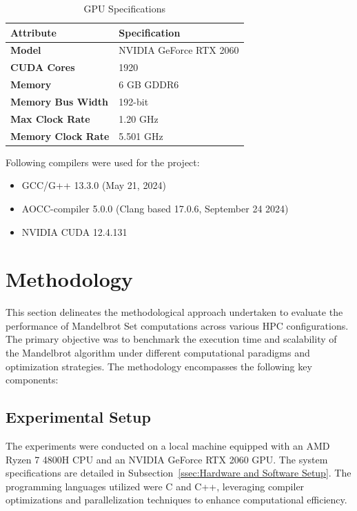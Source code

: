 \documentclass[
	report, %
	11pt, %
]{CSUniSchoolLabReport}
\newcounter{ct}
\begin{document}
\begin{table}[!htb]
	\captionsetup{justification=centering, width=.8\linewidth}
	\centering
	\begin{tabular}{ll}
		\hline
		\textbf{Attribute}         & \textbf{Specification}  \\
		\hline
		\textbf{Model}             & NVIDIA GeForce RTX 2060 \\
		\textbf{CUDA Cores}        & 1920                    \\
		\textbf{Memory}            & 6 GB GDDR6              \\
		\textbf{Memory Bus Width}  & 192-bit                 \\
		\textbf{Max Clock Rate}    & 1.20 GHz                \\
		\textbf{Memory Clock Rate} & 5.501 GHz               \\
		\hline
	\end{tabular}
	\caption{GPU Specifications}
	\label{tab:gpu_specs}
\end{table}

Following compilers were used for the project:
\begin{itemize}
	\item GCC/G++ 13.3.0 (May 21, 2024)
	\item AOCC-compiler 5.0.0 (Clang based 17.0.6, September 24 2024)
	\item NVIDIA CUDA 12.4.131
\end{itemize}

\section{Methodology}

This section delineates the methodological approach undertaken to evaluate the performance of Mandelbrot Set computations across various HPC configurations. The primary objective was to benchmark the execution time and scalability of the Mandelbrot algorithm under different computational paradigms and optimization strategies. The methodology encompasses the following key components:

\subsection{Experimental Setup}

The experiments were conducted on a local machine equipped with an AMD Ryzen 7 4800H CPU and an NVIDIA GeForce RTX 2060 GPU. The system specifications are detailed in Subsection~\ref{ssec:Hardware and Software Setup}. The programming languages utilized were C and C++, leveraging compiler optimizations and parallelization techniques to enhance computational efficiency.
\end{document}
